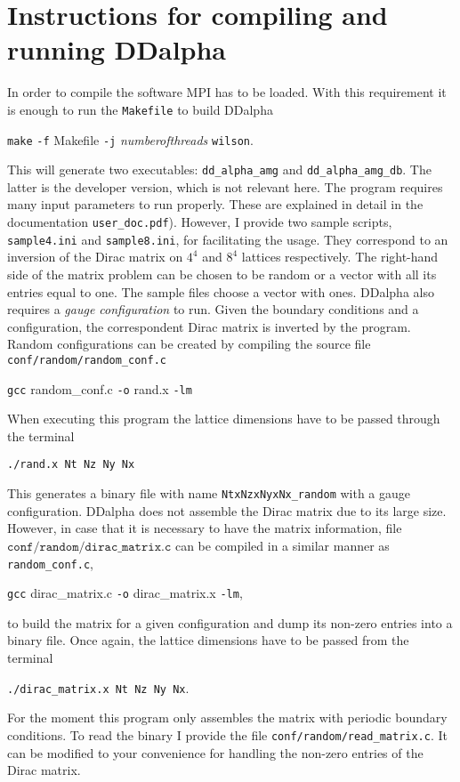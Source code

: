 \documentclass[a4paper,12pt]{scrartcl}
\begin{document}
\section{Instructions for compiling and running DDalpha}
In order to compile the software MPI has to be loaded. With this requirement it is enough to run the \texttt{Makefile} to build DDalpha   \begin{center}
\texttt{make} \texttt{-f} Makefile \texttt{-j} \textit{numberofthreads} \texttt{wilson}.
\end{center}This will generate two executables: \texttt{dd\_alpha\_amg} and \texttt{dd\_alpha\_amg\_db}. The latter is the developer version, which is not relevant here. The program requires many input parameters to run properly. These are explained in detail in the documentation \texttt{user\_doc.pdf}). However, I provide two sample scripts, \texttt{sample4.ini} and \texttt{sample8.ini}, for facilitating the usage. They correspond to an inversion of the Dirac matrix on $4^4$ and $8^4$ lattices respectively. The right-hand side of the matrix problem can be chosen to be random or a vector with all its entries equal to one. The sample files choose a vector with ones. DDalpha also requires a \textit{gauge configuration} to run. Given the boundary conditions and a configuration, the correspondent Dirac matrix  is inverted by the program. Random configurations can be created by compiling the source file \texttt{conf/random/random\_conf.c} \begin{center}
\texttt{gcc} random\_conf.c \texttt{-o} rand.x \texttt{-lm}
\end{center}When executing this program the lattice dimensions have to be passed through the terminal\begin{center}
 \texttt{./rand.x Nt Nz Ny Nx}
\end{center}This generates a binary file with name \texttt{NtxNzxNyxNx\_random} with a gauge configuration. DDalpha does not assemble the Dirac matrix due to its large size. However, in case that it is necessary to have the matrix information, file $\texttt{conf/random/dirac\_matrix.c}$ can be compiled in a similar manner as \texttt{random\_conf.c},\begin{center}
\texttt{gcc} dirac\_matrix.c \texttt{-o} dirac\_matrix.x \texttt{-lm},
\end{center}to build the matrix for a given configuration and dump its non-zero entries into a binary file. Once again, the lattice dimensions have to be passed from the terminal \begin{center}
 \texttt{./dirac\_matrix.x Nt Nz Ny Nx}.
\end{center}For the moment this program only assembles the matrix with periodic boundary conditions. To read the binary I provide the file \texttt{conf/random/read\_matrix.c}. It can be modified to your convenience for handling the non-zero entries of the Dirac matrix.
\end{document}
